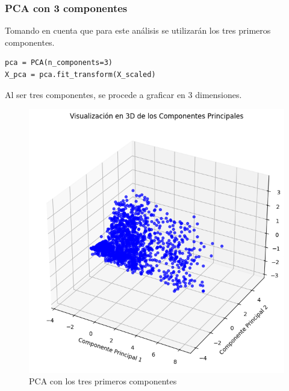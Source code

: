 \subsubsection{PCA con 3 componentes}
Tomando en cuenta que para este análisis se utilizarán los tres primeros componentes.

\begin{verbatim}
pca = PCA(n_components=3) 
X_pca = pca.fit_transform(X_scaled)
\end{verbatim}

Al ser tres componentes, se procede a graficar en 3 dimensiones.

\begin{figure}[H]
    \centering
    \includegraphics[width=1\textwidth]{images/pca-3-components.png}
    \caption{PCA con los tres primeros componentes}
    \label{fig:pca_3_components}
\end{figure}

